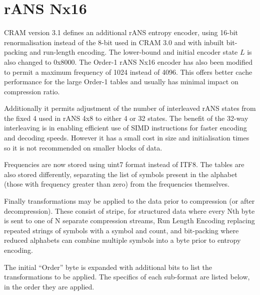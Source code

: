 \documentclass[a4paper]{article}
\begin{document}
\section{rANS Nx16}

CRAM version 3.1 defines an additional rANS entropy encoder, using
16-bit renormalisation instead of the 8-bit used in CRAM 3.0 and with
inbuilt bit-packing and run-length encoding.  The lower-bound and
initial encoder state $L$ is also changed to 0x8000. The Order-1 rANS
Nx16 encoder has also been modified to permit a maximum frequency of 1024
instead of 4096.  This offers better cache performance for the large
Order-1 tables and usually has minimal impact on compression ratio.

Additionally it permits adjustment of the number of interleaved rANS
states from the fixed 4 used in rANS 4x8 to either 4 or 32 states.
The benefit of the 32-way interleaving is in enabling efficient use of
SIMD instructions for faster encoding and decoding speeds.  However it
has a small cost in size and initialisation times so it is not
recommended on smaller blocks of data.

Frequencies are now stored using uint7 format instead of ITF8.  The
tables are also stored differently, separating the list of symbols
present in the alphabet (those with frequency greater than zero) from
the frequencies themselves.

Finally transformations may be applied to the data prior to
compression (or after decompression).  These consist of stripe, for
structured data where every Nth byte is sent to one of N separate
compression streams, Run Length Encoding replacing repeated strings of
symbols with a symbol and count, and bit-packing where reduced
alphabets can combine multiple symbols into a byte prior to entropy
encoding.

The initial ``Order'' byte is expanded with additional bits to list
the transformations to be applied.  The specifics of each sub-format
are listed below, in the order they are applied.
\end{document}
